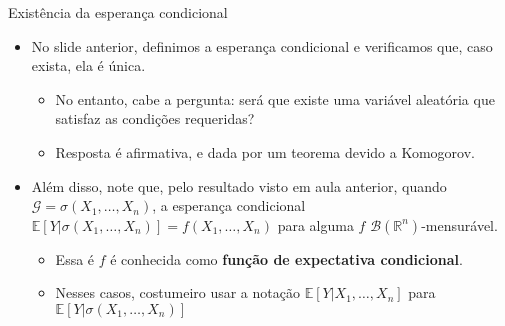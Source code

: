 \documentclass[11pt]{beamer}
\begin{document}
	
		\begin{frame}{Existência da esperança condicional}
		\begin{itemize}
			\item No slide anterior, definimos a esperança condicional e verificamos que, caso exista, ela é única.
			\begin{itemize}
				\item No entanto, cabe a pergunta: será que existe uma variável aleatória que satisfaz as condições requeridas?
						\item Resposta é {\color{red}afirmativa}, e dada por um teorema devido a Komogorov.
			\end{itemize}
			\item Além disso, note que, pelo resultado visto em aula anterior, quando $\mathcal{G} = \sigma(X_1,\ldots, X_n)$, a esperança condicional $\mathbb{E}[Y|\sigma(X_1,\ldots, X_n)] = f(X_1,\ldots,X_n)$ para alguma $f$ $\mathcal{B}(\mathbb{R}^n)$-mensurável.
			\begin{itemize}
				\item Essa é $f$ é conhecida como \textbf{função de expectativa condicional}.
				\item Nesses casos, costumeiro usar a notação $\mathbb{E}[Y|X_1,\ldots, X_n]$ para $\mathbb{E}[Y|\sigma(X_1,\ldots, X_n)]  $
			\end{itemize}
		\end{itemize}
	\end{frame}
\end{document}
